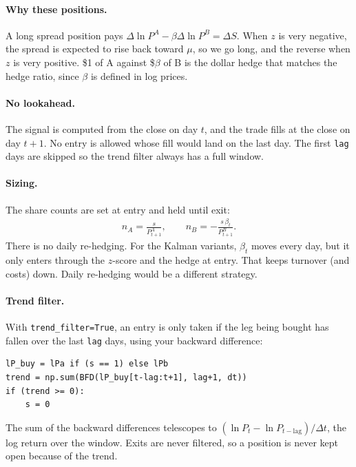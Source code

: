 \documentclass[11pt]{article}
\begin{document}
\paragraph{Why these positions.} A long spread position pays
$\Delta\ln P^A - \beta\Delta\ln P^B = \Delta S$. When $z$ is very negative,
the spread is expected to rise back toward $\mu$, so we go long, and the
reverse when $z$ is very positive. \$1 of A against \$$\beta$ of B is the
dollar hedge that matches the hedge ratio, since $\beta$ is defined in log
prices.

\paragraph{No lookahead.} The signal is computed from the close on day $t$,
and the trade fills at the close on day $t+1$. No entry is allowed whose fill
would land on the last day. The first \texttt{lag} days are skipped so the
trend filter always has a full window.

\paragraph{Sizing.} The share counts are set at entry and held until exit:
\begin{gather*}
    n_A = \frac{s}{P^A_{t+1}}, \qquad n_B = -\frac{s\,\beta_t}{P^B_{t+1}}.
\end{gather*}
There is no daily re-hedging. For the Kalman variants, $\beta_t$ moves every
day, but it only enters through the $z$-score and the hedge at entry. That
keeps turnover (and costs) down. Daily re-hedging would be a different
strategy.

\paragraph{Trend filter.} With \texttt{trend\_filter=True}, an entry is only
taken if the leg being bought has fallen over the last \texttt{lag} days, using
your backward difference:
\begin{lstlisting}
lP_buy = lPa if (s == 1) else lPb
trend = np.sum(BFD(lP_buy[t-lag:t+1], lag+1, dt))
if (trend >= 0):
    s = 0
\end{lstlisting}
The sum of the backward differences telescopes to
$(\ln P_t - \ln P_{t-\text{lag}})/\Delta t$, the log return over the window.
Exits are never filtered, so a position is never kept open because of the
trend.

\end{document}

